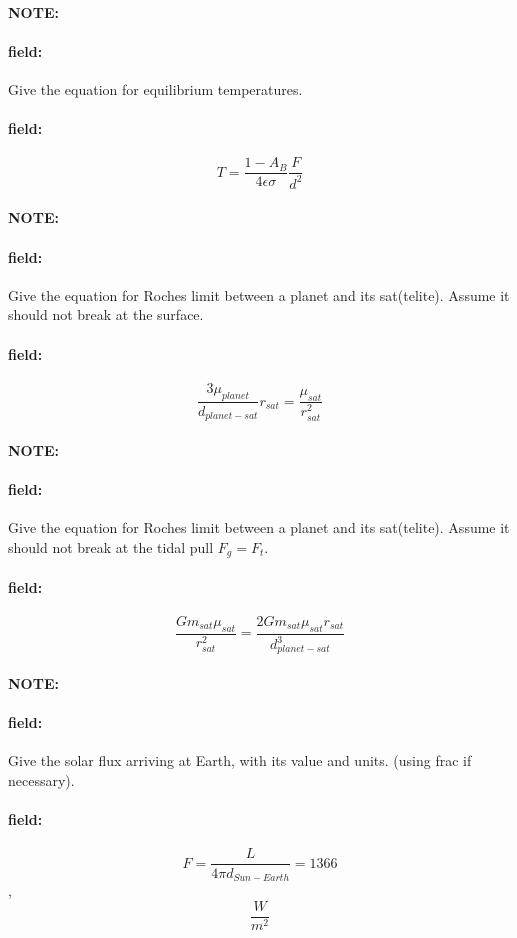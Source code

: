 \documentclass[12pt]{article}
\newenvironment{note}{\paragraph{NOTE:}}{}
\newenvironment{field}{\paragraph{field:}}{}
\begin{document}
\begin{note}
   \begin{field}
       Give the equation for equilibrium temperatures.
   \end{field}
   \begin{field}
		\[
			T = \frac{1-A_B}{4\epsilon\sigma}\frac{F}{d^2}
		\]
   \end{field}
\end{note}

\begin{note}
   \begin{field}
       Give the equation for Roches limit between a planet and its sat(telite). Assume it should not break at the surface.
   \end{field}
   \begin{field}
		\[
			\frac{3\mu_{planet}}{d_{planet-sat}}r_{sat}=\frac{\mu_{sat}}{r_{sat}^2}
		\]
   \end{field}
\end{note}
\begin{note}
   \begin{field}
       Give the equation for Roches limit between a planet and its sat(telite). Assume it should not break at the tidal pull \(F_g=F_t\).
   \end{field}
   \begin{field}
		\[
			\frac{Gm_{sat}\mu_{sat}}{r_{sat}^2}=\frac{2Gm_{sat}\mu_{sat}r_{sat}}{d_{planet-sat}^3}
		\]
   \end{field}
\end{note}
\begin{note}
   \begin{field}
       Give the solar flux arriving at Earth, with its value and units. (using frac if necessary).
   \end{field}
   \begin{field}
		\[
			F=\frac{L}{4\pi d_{Sun-Earth}}=1366
		\],
		\[
			\frac{W}{m^2}
		\]
   \end{field}
\end{note}
\end{document}
